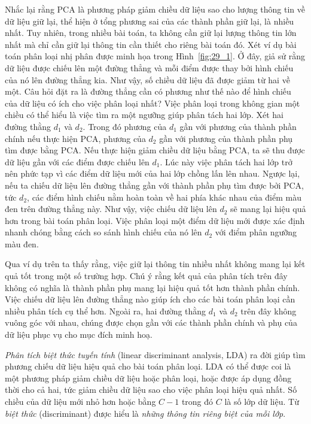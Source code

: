 Nhắc lại rằng PCA là phương pháp giảm chiều dữ liệu sao cho lượng thông tin về
dữ liệu giữ lại, thể hiện ở tổng phương sai của các thành phần giữ lại,
là nhiều nhất. Tuy nhiên, trong nhiều bài toán, ta không cần giữ lại lượng
thông tin lớn nhất mà chỉ cần giữ lại thông tin cần thiết cho riêng bài toán đó.
Xét ví dụ bài toán phân loại nhị phân được minh họa trong Hình~\ref{fig:29_1}. %
Ở đây, giả sử rằng dữ liệu được chiếu lên một đường thẳng và mỗi điểm được
thay bởi hình chiếu của nó lên đường thẳng kia. Như vậy, số chiều dữ liệu đã
được giảm từ hai về một. Câu hỏi đặt ra là đường thẳng cần có phương như thế
nào để hình chiếu của dữ liệu {có ích cho việc
phân loại nhất}? Việc phân loại trong không gian một chiều có thể hiểu là việc tìm ra một
ngưỡng giúp phân tách hai lớp. Xét hai
đường thằng $d_1$ và $d_2$. Trong đó phương của $d_1$ gần với phương của thành
phần chính nếu thực hiện PCA, phương của $d_2$ gần với phương của thành phần phụ
tìm được bằng PCA. Nếu thực hiện giảm chiều dữ liệu bằng PCA, ta sẽ thu được dữ
liệu gần với các điểm được chiếu lên $d_1$. Lúc này việc phân tách hai lớp trở
nên phức tạp vì các điểm dữ liệu mới của hai lớp chồng lấn lên nhau. Ngược lại,
nếu ta chiếu dữ liệu lên đường thẳng gần với thành phần phụ tìm được bởi PCA,
tức $d_2$, các điểm hình chiếu nằm hoàn toàn về hai phía khác nhau của điểm màu
đen trên đường thẳng này. Như vậy, việc chiếu dữ liệu lên $d_2$ sẽ mang lại hiệu
quả hơn trong bài toán phân loại. Việc phân loại một điểm dữ liệu mới được xác
định nhanh chóng bằng cách so sánh hình chiếu của nó lên $d_2$ với điểm phân ngưỡng màu đen.

Qua ví dụ trên ta thấy rằng, {việc giữ lại thông tin nhiều nhất không mang lại
kết quả tốt trong một số trường hợp.} Chú ý rằng kết quả của phân tích trên
đây không có nghĩa là thành phần phụ mang lại hiệu quả tốt
hơn thành phần chính. Việc chiếu dữ liệu lên đường thẳng
nào giúp ích cho các bài toán phân loại cần nhiều phân tích cụ thể hơn.
Ngoài ra, hai đường thằng $d_1$ và $d_2$ trên đây không vuông góc với nhau,
chúng được chọn gần với các thành phần chính và phụ của dữ liệu phục vụ cho mục
đích minh hoạ.

\textit{Phân tích biệt thức tuyến tính} (linear discriminant analysis, LDA) ra đời giúp tìm phương chiếu dữ liệu
hiệu quả cho bài toán phân loại. LDA có thể được coi là một phương pháp giảm
chiều dữ liệu hoặc phân loại, hoặc
được áp dụng đồng thời cho cả hai, tức giảm chiều dữ liệu sao cho việc phân loại
hiệu quả nhất. Số chiều của dữ liệu mới nhỏ hơn hoặc bằng $C-1$ trong đó $C$
là số lớp dữ liệu. Từ \textit{biệt thức} ({discriminant}) được hiểu là \textit{những
thông tin riêng biệt của mỗi lớp}.


